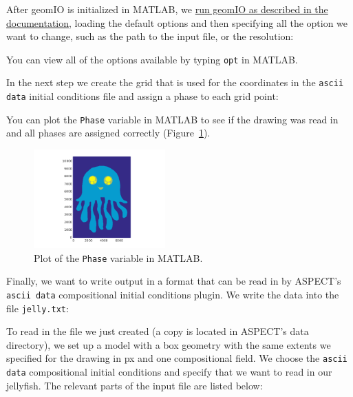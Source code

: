 \documentclass{article}
\newcommand{\aspect}{\textsc{ASPECT}}
\begin{document}
After geomIO is initialized in MATLAB, we \href{http://geomio-doc.bitbucket.org/tuto2D.html#assigning-phase-to-markers}
{run geomIO as described in the documentation}, loading the default options and then specifying all the option we want to 
change, such as the path to the input file, or the resolution: 

You can view all of the options available by typing \texttt{opt} in MATLAB. 

In the next step we create the grid that is used for the coordinates in the \texttt{ascii data} initial conditions file 
and assign a phase to each grid point: 

You can plot the \texttt{Phase} variable in MATLAB to see if the drawing was read in and all phases are assigned correctly 
(Figure~\ref{fig:jelly-plot}). 
\begin{figure}[tb]
    \centering
    \includegraphics[width=0.45\textwidth]{cookbooks/geomio/jelly.png}
    \caption{Plot of the \texttt{Phase} variable in MATLAB.}
    \label{fig:jelly-plot}
\end{figure}
Finally, we want to write output in a format that can be read in by \aspect{}'s \texttt{ascii data} compositional
initial conditions plugin. We write the data into the file \texttt{jelly.txt}:


To read in the file we just created (a copy is located in \aspect{}'s data directory), 
we set up a model with a box geometry with the same extents we specified for the drawing in px 
and one compositional field. We choose the \texttt{ascii data} compositional initial conditions and specify that we 
want to read in our jellyfish. The relevant parts of the input file are listed below:

\end{document}
